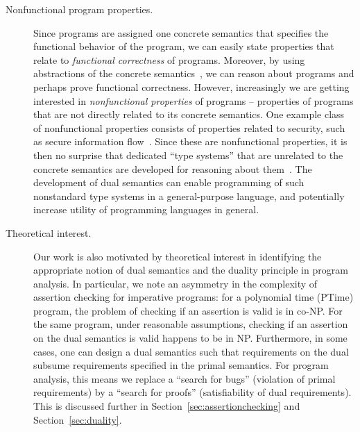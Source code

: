 \documentclass[preprint]{sig-alternate-05-2015}
\begin{document}
{\begin{description}
  \item[Nonfunctional program properties.]
    Since programs are assigned one concrete semantics that
    specifies the functional behavior of the program,
    we can easily state properties that relate to
    {\em{functional correctness}} of programs.
    Moreover, by using abstractions of the concrete
    semantics~\cite{CousotCousot77:POPL}, we can reason about
    programs and perhaps prove functional correctness.
    However, increasingly we are getting interested in
    {\em{nonfunctional properties}} of programs -- properties
    of programs that are not directly related to its concrete semantics.
    One example class of nonfunctional properties
    consists of properties related to security, such as
    secure information flow~\cite{DBLP:journals/cacm/DenningD77}.
    Since these are nonfunctional properties, it is then
    no surprise that dedicated ``type systems'' that are unrelated
    to the concrete semantics are
    developed
    for reasoning about them~\cite{DBLP:conf/csfw/Smith01,DBLP:conf/csfw/MalozemoffKG14}.
    The development of dual semantics
    can enable programming of such nonstandard type systems in a
    general-purpose language, and potentially increase
    utility of programming languages in general.



  \item[Theoretical interest.]
    Our work is also motivated by theoretical interest in
    identifying the appropriate notion of
    dual semantics and the duality principle in program analysis.
    In particular, we note an asymmetry in the complexity
    of assertion checking for imperative programs:
    for a polynomial time (PTime) program, the problem of
    checking if an assertion is valid is in co-NP.
    For the same program, under reasonable assumptions,
    checking if an assertion on the dual semantics is valid
    happens to be in NP.
    Furthermore, in some cases, one can design a dual semantics such
    that requirements on the dual subsume requirements specified in 
    the primal semantics.
    For program analysis, this means we replace a ``search for bugs''
    (violation of primal requirements)
    by a ``search for proofs'' (satisfiability of dual requirements).
    This is discussed further in Section~\ref{sec:assertionchecking}
    and Section~\ref{sec:duality}.


\end{description}

\endignore}
\end{document}
